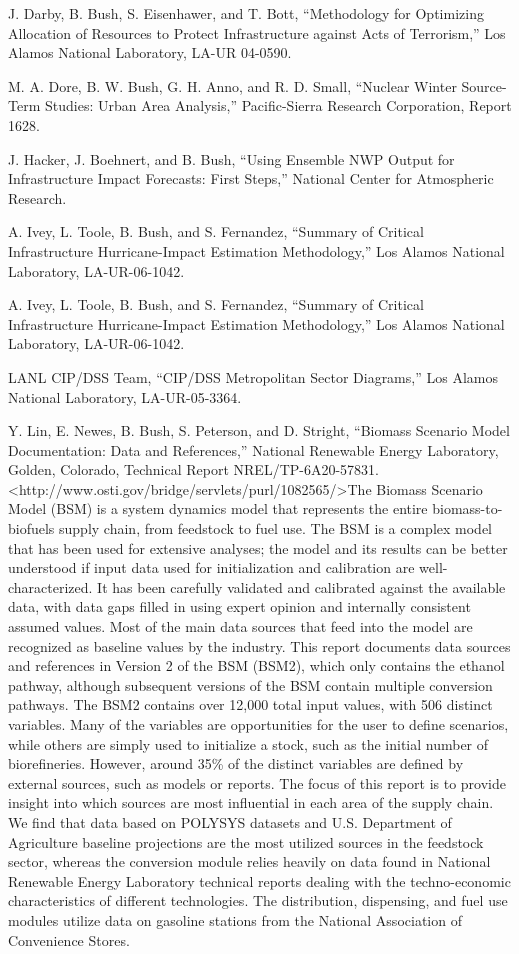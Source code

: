 \documentclass[]{article}
\begin{document}
J. Darby, B. Bush, S. Eisenhawer, and T. Bott, ``Methodology for
Optimizing Allocation of Resources to Protect Infrastructure against
Acts of Terrorism,'' Los Alamos National Laboratory, LA-UR 04-0590.

M. A. Dore, B. W. Bush, G. H. Anno, and R. D. Small, ``Nuclear Winter
Source-Term Studies: Urban Area Analysis,'' Pacific-Sierra Research
Corporation, Report 1628.

J. Hacker, J. Boehnert, and B. Bush, ``Using Ensemble NWP Output for
Infrastructure Impact Forecasts: First Steps,'' National Center for
Atmospheric Research.

A. Ivey, L. Toole, B. Bush, and S. Fernandez, ``Summary of Critical
Infrastructure Hurricane-Impact Estimation Methodology,'' Los Alamos
National Laboratory, LA-UR-06-1042.

A. Ivey, L. Toole, B. Bush, and S. Fernandez, ``Summary of Critical
Infrastructure Hurricane-Impact Estimation Methodology,'' Los Alamos
National Laboratory, LA-UR-06-1042.

LANL CIP/DSS Team, ``CIP/DSS Metropolitan Sector Diagrams,'' Los Alamos
National Laboratory, LA-UR-05-3364.

Y. Lin, E. Newes, B. Bush, S. Peterson, and D. Stright, ``Biomass
Scenario Model Documentation: Data and References,'' National Renewable
Energy Laboratory, Golden, Colorado, Technical Report
NREL/TP-6A20-57831.
\textless{}http://www.osti.gov/bridge/servlets/purl/1082565/\textgreater{}The
Biomass Scenario Model (BSM) is a system dynamics model that represents
the entire biomass-to-biofuels supply chain, from feedstock to fuel use.
The BSM is a complex model that has been used for extensive analyses;
the model and its results can be better understood if input data used
for initialization and calibration are well-characterized. It has been
carefully validated and calibrated against the available data, with data
gaps filled in using expert opinion and internally consistent assumed
values. Most of the main data sources that feed into the model are
recognized as baseline values by the industry. This report documents
data sources and references in Version 2 of the BSM (BSM2), which only
contains the ethanol pathway, although subsequent versions of the BSM
contain multiple conversion pathways. The BSM2 contains over 12,000
total input values, with 506 distinct variables. Many of the variables
are opportunities for the user to define scenarios, while others are
simply used to initialize a stock, such as the initial number of
biorefineries. However, around 35\% of the distinct variables are
defined by external sources, such as models or reports. The focus of
this report is to provide insight into which sources are most
influential in each area of the supply chain. We find that data based on
POLYSYS datasets and U.S. Department of Agriculture baseline projections
are the most utilized sources in the feedstock sector, whereas the
conversion module relies heavily on data found in National Renewable
Energy Laboratory technical reports dealing with the techno-economic
characteristics of different technologies. The distribution, dispensing,
and fuel use modules utilize data on gasoline stations from the National
Association of Convenience Stores.
\end{document}
